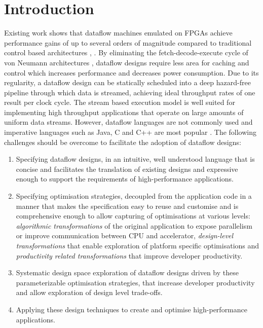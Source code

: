 \section{Introduction}

Existing work shows that dataflow machines emulated on FPGAs achieve
performance gains of up to several orders of magnitude compared to
traditional control based architectures \cite{Flynn:Pell:Mencer:2012},
\cite{Mencer:2012}. By eliminating the fetch-decode-execute cycle of
von Neumann architectures \cite{Neumann:1993}, dataflow designs
require less area for caching and control which increases performance
and decreases power consumption. Due to its regularity, a dataflow
design can be statically scheduled into a deep hazard-free pipeline
through which data is streamed, achieving ideal throughput rates of
one result per clock cycle. The stream based execution model is well
suited for implementing high throughput applications that operate on
large amounts of uniform data streams. However, dataflow languages are
not commonly used and imperative languages such as Java, C and C++ are
most popular \cite{Tiobe:2012}. The following challenges should be
overcome to facilitate the adoption of dataflow designs:
\begin{enumerate}
\item Specifying dataflow designs, in an intuitive, well understood
  language that is concise and facilitates the translation of existing
  designs and expressive enough to support the requirements of
  high-performance applications.
\item Specifying optimisation strategies, decoupled from the
  application code in a manner that makes the specification easy to
  reuse and customise and is comprehensive enough to allow capturing
  of optimisations at various levels: \emph{algorithmic
    transformations} of the original application to expose parallelism
  or improve communication between CPU and accelerator,
  \emph{design-level transformations} that enable exploration of
  platform specific optimisations and \emph{productivity related
    transformations} that improve developer productivity.
\item Systematic design space exploration of dataflow designs driven
  by these parameterizable optimisation strategies, that increase
  developer productivity and allow exploration of design level
  trade-offs.
\item Applying these design techniques to create and optimise
  high-performance applications.
\end{enumerate}

